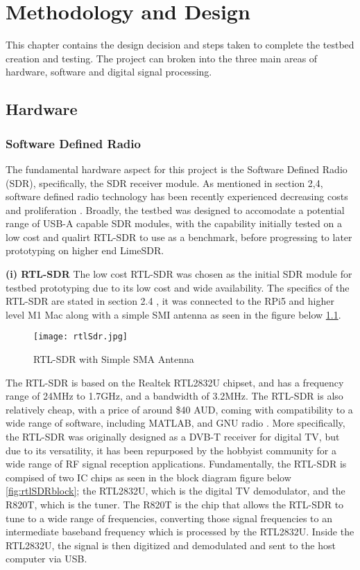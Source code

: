 \chapter{Methodology and Design \label{sec:methodology}}

This chapter contains the design decision and steps taken to complete the testbed creation and testing. The project can broken into the three main areas of hardware, software and digital signal processing. 

\section{Hardware \label{sec:hardware}}

\subsection{Software Defined Radio \label{sec: SDRdongleHardware}}
The fundamental hardware aspect for this project is the Software Defined Radio (SDR), specifically, the SDR receiver module.  As mentioned in section 2,4, software defined radio technology has been recently experienced decreasing costs and proliferation \cite{SDRtheory}. Broadly, the testbed was designed to accomodate a potential range of USB-A capable SDR modules, with the capability initially tested on a low cost and qualirt RTL-SDR to use as a benchmark, before progressing to later prototyping on higher end LimeSDR.

\vspace{0.5cm} \noindent 
\textbf{(i) RTL-SDR}
The low cost RTL-SDR was chosen as the initial SDR module for testbed prototyping  due to its low cost and wide availability. The specifics of the RTL-SDR are stated in section 2.4 , it was connected to the RPi5 and higher level M1 Mac along with a simple SMI antenna as seen in the figure below \ref*{fig:rtlSDR}. 

\begin{figure}[htbp]
    \centering
    \texttt{[image: rtlSdr.jpg]}
    \caption{RTL-SDR with Simple SMA Antenna}
    \label{fig:rtlSDR}
\end{figure}

The RTL-SDR is based on the Realtek RTL2832U chipset, and has a frequency range of 24MHz to 1.7GHz, and a bandwidth of 3.2MHz. The RTL-SDR is also relatively cheap, with a price of around \$40 AUD, coming with compatibility to a wide range of software, including MATLAB, and GNU radio \cite{SDRdongle}. More specifically, the RTL-SDR was originally designed as a DVB-T receiver for digital TV, but due to its versatility, it has been repurposed by the hobbyist community for a wide range of RF signal reception applications. Fundamentally, the RTL-SDR is compised of two IC chips as seen in the block diagram figure below \ref*{fig:rtlSDRblock}; the RTL2832U, which is the digital TV demodulator, and the R820T, which is the tuner. The R820T is the chip that allows the RTL-SDR to tune to a wide range of frequencies, converting those signal frequencies to an intermediate baseband frequency which is processed by the RTL2832U. Inside the RTL2832U, the signal is then digitized and demodulated and sent to the host computer via USB.

